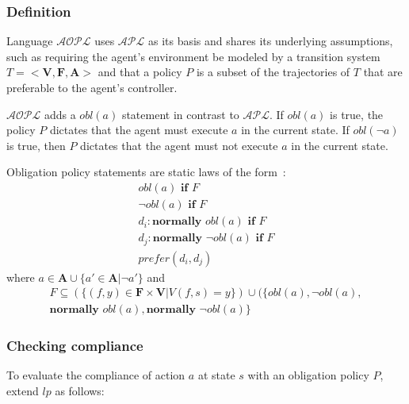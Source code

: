 \subsubsection{Definition}

Language $\mathcal{AOPL}$ uses $\mathcal{APL}$ as its basis and shares its underlying assumptions, such as requiring the agent's environment be modeled by a transition system $T=<\boldsymbol{V}, \boldsymbol{F}, \boldsymbol{A}>$ and that a policy $P$ is a subset of the trajectories of $T$ that are preferable to the agent's controller.

$\mathcal{AOPL}$ adds a $obl(a)$ statement in contrast to $\mathcal{APL}$.
If $obl(a)$ is true, the policy $P$ dictates that the agent must execute $a$ in the current state.
If $obl(\neg a)$ is true, then $P$ dictates that the agent must not execute $a$ in the current state.

\begin{definition}
    Obligation policy statements are static laws of the form~\citep{gelfond_authorization_2008}:
    \begin{gather*}
        obl\left(a\right) \textbf{ if } F \\
        \neg obl\left(a\right) \textbf{ if } F \\
        d_i: \textbf{normally } obl(a) \textbf{ if } F \\
        d_j: \textbf{normally } \neg obl(a) \textbf{ if } F \\
        prefer(d_i, d_j)
    \end{gather*}
    where $a \in \boldsymbol{A} \cup \{a' \in \boldsymbol{A} | \neg a'\}$ and
    \begin{multline*}
        F\subseteq\left(\{(f, y) \in \boldsymbol{F} \times \boldsymbol{V} | V(f,s)=y\}\right) \cup (\{obl(a),
            \neg obl(a), \\
            \textbf{normally } obl(a),
            \textbf{normally } \neg obl(a)\}
    \end{multline*}
\end{definition}

\subsubsection{Checking compliance}

To evaluate the compliance of action $a$ at state $s$ with an obligation policy $P$, \citet{gelfond_authorization_2008} extend $lp$ as follows:

